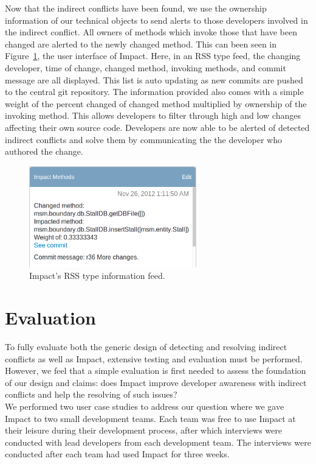 \documentclass[conference]{IEEEtran}
\begin{document}
Now that the indirect conflicts have been found, we use the
ownership information of our technical objects to send alerts to
those developers involved in the indirect conflict. All owners
of methods which invoke those that have been changed are alerted
to the newly changed method. This can been seen in
Figure~\ref{fig:impact}, the user interface of Impact. Here, in an RSS type
feed, the changing developer, time of change, changed method,
invoking methods, and commit message are all displayed. This 
list is auto updating as new commits are pushed to the central
git repository. The information provided also comes with a simple
weight of the percent changed of changed method multiplied by 
ownership of the invoking method. This allows developers to filter
through high and low changes affecting their own source code.
Developers are now able to be alerted of detected indirect
conflicts and solve them by communicating the the developer
who authored the change.\\

\begin{figure}[t!]
\includegraphics{images/ImpactDemo}
\caption{Impact's RSS type information feed.\label{fig:impact}}
\end{figure}


\section{Evaluation}
To fully evaluate both the generic design of detecting and resolving
indirect conflicts as well as Impact, extensive testing and evaluation
must be performed. However, we feel that a simple evaluation is
first needed to assess the foundation of our design and claims:
does Impact improve developer awareness with indirect conflicts
and help the resolving of such issues?\\

We performed two user case studies to address our question where
we gave Impact to two small development teams. Each team was
free to use Impact at their leisure during their development process,
after which interviews were conducted with lead developers from 
each development team. The interviews were conducted after each
team had used Impact for three weeks.\\
\end{document}
